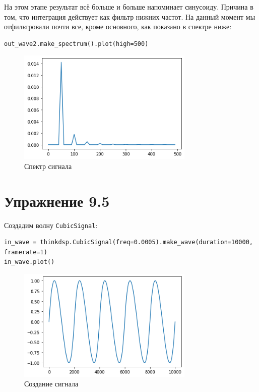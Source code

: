 \documentclass[a4paper,12pt]{report}
\begin{document}
На этом этапе результат всё больше и больше напоминает синусоиду. Причина в том, что интеграция действует как фильтр нижних частот. На данный момент мы отфильтровали почти все, кроме основного, как показано в спектре ниже:

\begin{lstlisting}[caption=Спектр сигнала]
out_wave2.make_spectrum().plot(high=500)
\end{lstlisting}

\begin{figure}[H]
        \centering
        \includegraphics[width=0.75\textwidth]{lab9_fig4_5.png}
        \caption{Спектр сигнала}
        \label{fig:lab9_fig4_5}
\end{figure}

\chapter{Упражнение 9.5}

Создадим волну \texttt{CubicSignal}:

\begin{lstlisting}[caption=Создание сигнала]
in_wave = thinkdsp.CubicSignal(freq=0.0005).make_wave(duration=10000, framerate=1)
in_wave.plot()
\end{lstlisting}

\begin{figure}[H]
        \centering
        \includegraphics[width=0.75\textwidth]{lab9_fig5_1.png}
        \caption{Создание сигнала}
        \label{fig:lab9_fig5_1}
\end{figure}
\end{document}
